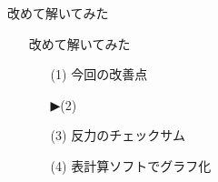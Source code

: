 \begin{frame}{改めて解いてみた}
  \begin{itemize}
      \item[] 改めて解いてみた
      \begin{itemize}[itemsep=1.3ex, leftmargin=1cm]
        \item[(1)]  {\color{cud_lightgray}今回の改善点}
	\item[▶(2)]   
	\item[(3)]  {\color{cud_lightgray}反力のチェックサム}
	\item[(4)]  {\color{cud_lightgray}表計算ソフトでグラフ化}
      \end{itemize}
  \end{itemize}
\end{frame}
